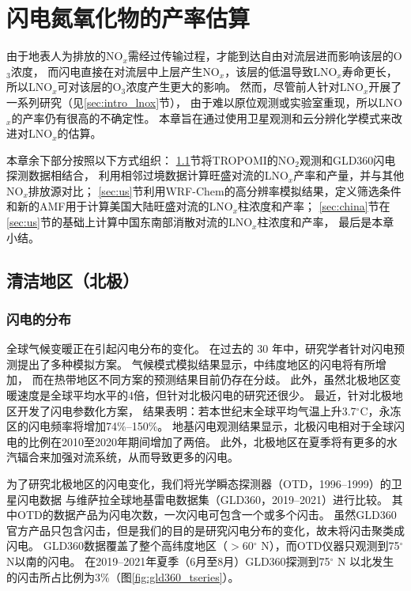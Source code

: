 
\chapter{闪电氮氧化物的产率估算} \label{chapter:PE}

由于地表人为排放的NO$_x$需经过传输过程，才能到达自由对流层进而影响该层的O$_3$浓度，
而闪电直接在对流层中上层产生NO$_x$，该层的低温导致LNO$_x$寿命更长，
所以LNO$_x$可对该层的O$_3$浓度产生更大的影响。
然而，尽管前人针对LNO$_x$开展了一系列研究（见\ref{sec:intro_lnox}节），
由于难以原位观测或实验室重现，所以LNO$_x$的产率仍有很高的不确定性。
本章旨在通过使用卫星观测和云分辨化学模式来改进对LNO$_x$的估算。

本章余下部分按照以下方式组织：
\ref{sec:arctic}节将TROPOMI的NO$_2$观测和GLD360闪电探测数据相结合，
利用相邻过境数据计算旺盛对流的LNO$_x$产率和产量，并与其他NO$_x$排放源对比；
\ref{sec:us}节利用WRF-Chem的高分辨率模拟结果，定义筛选条件和新的AMF用于计算美国大陆旺盛对流的LNO$_x$柱浓度和产率；
\ref{sec:china}节在\ref{sec:us}节的基础上计算中国东南部消散对流的LNO$_x$柱浓度和产率，
最后是本章小结。


\section{清洁地区（北极）} \label{sec:arctic}

\subsection{闪电的分布} \label{subsect:lightning_distribution}

全球气候变暖正在引起闪电分布的变化\citep{Reeve.1999,Williams.2005a,Price.2009a}。
在过去的 30 年中，研究学者针对闪电预测提出了多种模拟方案\citep{Price.1992,Price.1997b,Allen.2002,Futyan.2007,Finney.2014,Romps.2014}。
气候模式模拟结果显示，中纬度地区的闪电将有所增加\citep{Michalon.1999,Romps.2014,Luhar.2021}，
而在热带地区不同方案的预测结果目前仍存在分歧\citep{Finney.2018,Romps.2019}。
此外，虽然北极地区变暖速度是全球平均水平的4倍\citep{Rantanen.2022}，但针对北极闪电的研究还很少。
最近，\citet{Chen.2021a}针对北极地区开发了闪电参数化方案，
结果表明：若本世纪末全球平均气温上升3.7$^{\circ}$C，永冻区的闪电频率将增加74\%--150\%。
地基闪电观测结果显示，北极闪电相对于全球闪电的比例在2010至2020年期间增加了两倍\citep{Holzworth.2021}。
此外，北极地区在夏季将有更多的水汽辐合来加强对流系统，从而导致更多的闪电\citep{Bintanja.2020}。

为了研究北极地区的闪电变化，我们将光学瞬态探测器（OTD，1996--1999）的卫星闪电数据
与维萨拉全球地基雷电数据集（GLD360，2019--2021）进行比较。
其中OTD的数据产品为闪电次数，一次闪电可包含一个或多个闪击。
虽然GLD360官方产品只包含闪击，但是我们的目的是研究闪电分布的变化，故未将闪击聚类成闪电。
GLD360数据覆盖了整个高纬度地区（$>$60$^{\circ}$ N），而OTD仪器只观测到75$^{\circ}$ N以南的闪电。
在2019--2021年夏季（6月至8月）GLD360探测到75$^{\circ}$ N 以北发生的闪击所占比例为3\%（图\ref{fig:gld360_tseries}）。

